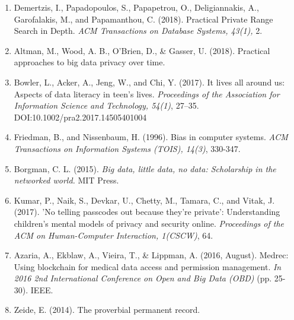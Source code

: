 \documentclass{article}
\begin{document}
\begin{enumerate}
    \label{sec:23}
    \item Demertzis, I., Papadopoulos, S., Papapetrou, O., Deligiannakis, A., Garofalakis, M., and Papamanthou, C. (2018). Practical Private Range Search in Depth. \textit{ACM Transactions on Database Systems, 43(1),} 2.
    \label{sec:24}
    \item Altman, M., Wood, A. B., O'Brien, D., & Gasser, U. (2018). Practical approaches to big data privacy over time.
    \label{sec:25}
    \item Bowler, L., Acker, A., Jeng, W., and Chi, Y. (2017). It lives all around us: Aspects of data literacy in teen’s lives. \textit{Proceedings of the Association for Information Science and Technology, 54(1)}, 27–35. DOI:10.1002/pra2.2017.14505401004 
    \label{sec:26}
    \item Friedman, B., and Nissenbaum, H. (1996). Bias in computer systems. \textit{ACM Transactions on Information Systems (TOIS), 14(3)}, 330-347.
    \label{sec:27}
    \item Borgman, C. L. (2015). \textit{Big data, little data, no data: Scholarship in the networked world.} MIT Press.
    \label{sec:28}
    \item Kumar, P., Naik, S., Devkar, U., Chetty, M., Tamara, C., and Vitak, J. (2017). 'No telling passcodes out because they’re private’: Understanding children’s mental models of privacy and security online. \textit{Proceedings of the ACM on Human-Computer Interaction, 1(CSCW)}, 64.
    \label{sec:29}
    \item Azaria, A., Ekblaw, A., Vieira, T., & Lippman, A. (2016, August). Medrec: Using blockchain for medical data access and permission management. \textit{In 2016 2nd International Conference on Open and Big Data (OBD)} (pp. 25-30). IEEE.
    \label{sec:30}
    \item Zeide, E. (2014). The proverbial permanent record.

\end{enumerate}
\end{document}
